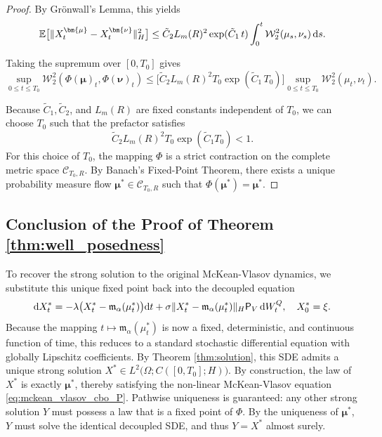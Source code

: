 \documentclass[12pt]{amsart}
\newcommand{\D}[1]{\mbox{\rm #1}}
\newcommand{\dd}{\D{d}}
\numberwithin{equation}{section}
\begin{document}
\begin{proof}
By Gr\"onwall's Lemma, this yields 
\begin{equation*}
    \mathbb{E}\big[\|X^{\bm{\mu}}_t - X^{\bm{\nu}}_t\|_H^2\big] \leq \tilde{C}_2 L_m(R)^2 \exp(\tilde{C}_1 \,t) \int_0^t \mathcal{W}_2^2(\mu_s, \nu_s)\, \dd s.
\end{equation*}

Taking the supremum over $[0, T_0]$ gives 
\begin{equation*}
    \sup_{0 \leq t \leq T_0} \mathcal{W}_2^2(\Phi({\bm{\mu}})_t, \Phi({\bm{\nu}})_t) \leq \big[ \tilde{C}_2 L_m(R)^2 T_0 \exp(\tilde{C}_1\, T_0) \big] \sup_{0 \leq t \leq T_0} \mathcal{W}_2^2(\mu_t, \nu_t).
\end{equation*}

Because $\tilde{C}_1, \tilde{C}_2$, and $L_m(R)$ are fixed constants independent of $T_0$, we can choose $T_0$ such that the prefactor satisfies 
\begin{equation*}
    \tilde{C}_2 L_m(R)^2 T_0 \exp(\tilde{C}_1 T_0) < 1.
\end{equation*}
For this choice of $T_0$, the mapping $\Phi$ is a strict contraction on the complete metric space $\mathscr{C}_{T_0, R}$. By Banach's Fixed-Point Theorem, there exists a unique probability measure flow ${\bm{\mu}}^* \in \mathscr{C}_{T_0, R}$ such that $\Phi({\bm{\mu}}^*) = {\bm{\mu}}^*$.
\end{proof}





\subsection*{Conclusion of the Proof of Theorem \ref{thm:well_posedness}}

To recover the strong solution to the original McKean-Vlasov dynamics, we substitute this unique fixed point back into the decoupled equation
\begin{equation*}
    \dd X_t^* = -\lambda \big(X_t^* - \mathfrak{m}_\alpha(\mu_t^*)\big)\dd t + \sigma \|X_t^* - \mathfrak{m}_\alpha(\mu_t^*)\|_H \mathsf{P}_V \,\dd W_t^Q, \quad X_0^* = \xi.
\end{equation*}
Because the mapping $t \mapsto \mathfrak{m}_\alpha(\mu_t^*)$ is now a fixed, deterministic, and continuous function of time, this reduces to a standard stochastic differential equation with globally Lipschitz coefficients. By Theorem \ref{thm:solution}, this SDE admits a unique strong solution $X^* \in L^2\big(\Omega; C([0,T_0]; H)\big)$. By construction, the law of $X^*$ is exactly $\bm{\mu}^*$, thereby satisfying the non-linear McKean-Vlasov equation \eqref{eq:mckean_vlasov_cbo_P}. Pathwise uniqueness is guaranteed: any other strong solution $Y$ must possess a law that is a fixed point of $\Phi$. By the uniqueness of $\bm{\mu}^*$, $Y$ must solve the identical decoupled SDE, and thus $Y = X^*$ almost surely.
\end{document}
